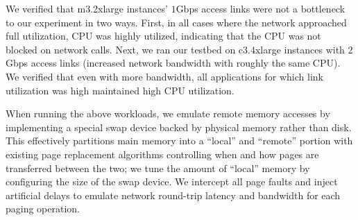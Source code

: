 We verified that m3.2xlarge instances' $1$Gbps access links were not a bottleneck to our experiment in two ways. 
First, in all cases where the network approached full utilization, CPU was highly utilized, indicating that the CPU was not blocked on network calls.
Next, we ran our testbed on c3.4xlarge instances with $2$Gbps access links (increased network bandwidth with roughly the same CPU). We verified that even with more bandwidth, all applications for which link utilization was high maintained high CPU utilization.

%
\begin{figure}[t]
    \centering
    \caption{\small{}}
    \label{fig:bandwidths11}
\end{figure}
%

When running the above workloads, we emulate remote memory accesses by implementing a special swap device backed by physical memory rather than disk. 
This effectively partitions main memory into a ``local'' and ``remote'' portion with existing page replacement algorithms controlling when and how pages are transferred between the two; we tune the amount of ``local'' memory by configuring the size of the swap device.
We intercept all page faults and inject artificial delays to emulate network round-trip latency and bandwidth for each paging operation. 

